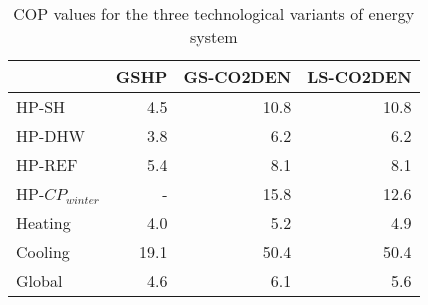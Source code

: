 \begin{table}[htp]
\centering
\caption{COP values for the three technological variants of energy system}\vspace{2mm}
\label{tab:V_cops} 
\begin{tabular}{lrrr}
	\toprule
	& GSHP & GS-CO2DEN & LS-CO2DEN \\ \midrule
	HP-SH            & 4.5  & 10.8    & 10.8    \\
	HP-DHW           & 3.8  & 6.2     & 6.2     \\
	HP-REF           & 5.4  & 8.1     & 8.1     \\
	HP-$CP_{winter}$ & -    & 15.8    & 12.6    \\
	Heating          & 4.0  & 5.2     & 4.9     \\
	Cooling          & 19.1 & 50.4      & 50.4      \\
	Global           & 4.6  & 6.1     & 5.6    \\ \bottomrule
\end{tabular}
\end{table}

